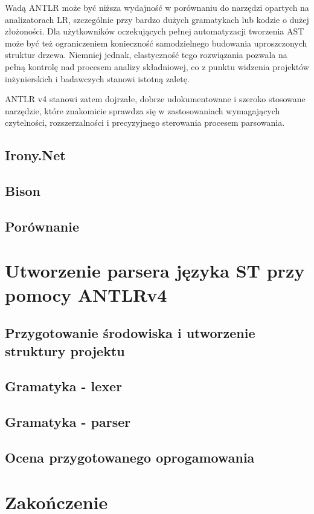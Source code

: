 \documentclass[12pt,twoside]{article}
\begin{document}
Wadą ANTLR może być niższa wydajność w porównaniu do narzędzi opartych na analizatorach LR, szczególnie przy bardzo dużych gramatykach lub kodzie o dużej złożoności. Dla użytkowników oczekujących pełnej automatyzacji tworzenia AST może być też ograniczeniem konieczność samodzielnego budowania uproszczonych struktur drzewa. Niemniej jednak, elastyczność tego rozwiązania pozwala na pełną kontrolę nad procesem analizy składniowej, co z punktu widzenia projektów inżynierskich i badawczych stanowi istotną zaletę.

ANTLR v4 stanowi zatem dojrzałe, dobrze udokumentowane i szeroko stosowane narzędzie, które znakomicie sprawdza się w zastosowaniach wymagających czytelności, rozszerzalności i precyzyjnego sterowania procesem parsowania.

\subsection{Irony.Net}
\subsection{Bison}
\subsection{Porównanie}
\clearpage
\section{Utworzenie parsera języka ST przy pomocy ANTLRv4}
\subsection{Przygotowanie środowiska i utworzenie struktury projektu}
\subsection{Gramatyka - lexer}
\subsection{Gramatyka - parser}
\subsection{Ocena przygotowanego oprogamowania}
\clearpage

\section{Zakończenie}
\end{document}
